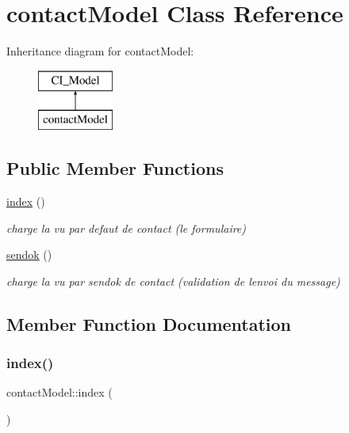 \hypertarget{classcontact_model}{}\section{contact\+Model Class Reference}
\label{classcontact_model}
Inheritance diagram for contact\+Model\+:\begin{figure}[H]
\begin{center}
\leavevmode
\includegraphics[height=2.000000cm]{classcontact_model}
\end{center}
\end{figure}
\subsection*{Public Member Functions}
\begin{DoxyCompactItemize}
\item 
\mbox{\hyperlink{classcontact_model_a888063be500796e0a59d1ae0e678d575}{index}} ()
\begin{DoxyCompactList}\small\item\em charge la vu par defaut de contact (le formulaire) \end{DoxyCompactList}\item 
\mbox{\hyperlink{classcontact_model_ab9e3c7e7068a12731b2c07f032eab736}{sendok}} ()
\begin{DoxyCompactList}\small\item\em charge la vu par sendok de contact (validation de l\textquotesingle{}envoi du message) \end{DoxyCompactList}\end{DoxyCompactItemize}


\subsection{Member Function Documentation}
\mbox{\label{classcontact_model_a888063be500796e0a59d1ae0e678d575}} 
\subsubsection{\texorpdfstring{index()}{index()}}
{\footnotesize\ttfamily contact\+Model\+::index (\begin{DoxyParamCaption}{ }\end{DoxyParamCaption})}



